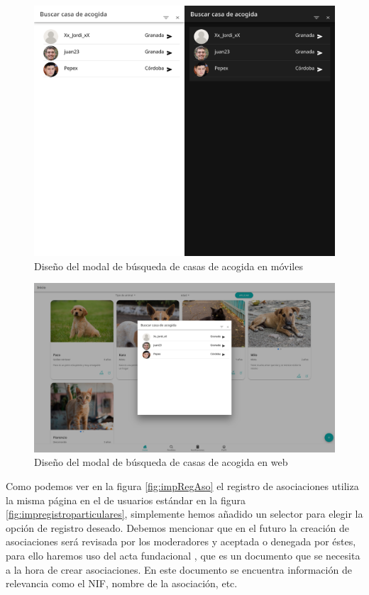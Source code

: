 \begin{figure} [H]
	\centering
	\includegraphics[width=1\linewidth]{sprint 3//hu13/implementacion.png}
	\caption{Diseño del modal de búsqueda de casas de acogida en móviles}
	\label{fig:impBusquedaAcogida}
\end{figure}

\begin{figure}[H]
	\centering
	\includegraphics[width=1\linewidth]{sprint 3//hu13/implementacionWeb.png}
	\caption{Diseño del modal de búsqueda de casas de acogida en web}
\end{figure}


Como podemos ver en la figura \ref{fig:impRegAso} el registro de asociaciones utiliza la misma página en el de usuarios estándar en la figura \ref{fig:impregistroparticulares}, simplemente hemos añadido un selector para elegir la opción de registro deseado. Debemos mencionar que en el futuro la creación de asociaciones será revisada por los moderadores y aceptada o denegada por éstes, para ello haremos uso del acta fundacional \cite{actaFundacional}, que es un documento que se necesita a la hora de crear asociaciones. En este documento se encuentra información de relevancia como el NIF, nombre de la asociación, etc.

